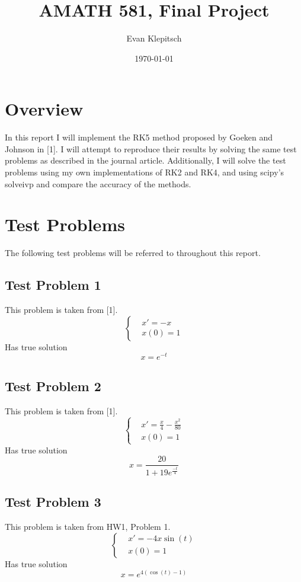 \documentclass{article}
\title{AMATH 581, Final Project}
\author{Evan Klepitsch}
\date{\today}
\begin{document}
\maketitle
\section{Overview}
In this report I will implement the RK5 method proposed by Goeken and Johnson in [1]. I will attempt to reproduce their results by solving the same test problems as described in the journal article.  Additionally, I will solve the test problems using my own implementations of RK2 and RK4, and using scipy's solve\textunderscore ivp and compare the accuracy of the methods.

\section{Test Problems}
The following test problems will be referred to throughout this report.
\subsection{Test Problem 1}
This problem is taken from [1].
\begin{equation} \label{eq:test_problem_1}
\left\{
\begin {aligned}
& x' = -x \\
& x(0) = 1
\end{aligned}
\right.
\end{equation}
Has true solution
\begin{equation}
x = e^{-t}
\end{equation}
\subsection{Test Problem 2}
This problem is taken from [1].
\begin{equation} \label{eq:test_problem_2}
\left\{
\begin {aligned}
& x' = \frac{x}{4} - \frac{x^2}{80} \\
& x(0) = 1
\end{aligned}
\right.
\end{equation}
Has true solution
\begin{equation}
x = \frac{20}{1 + 19e^{\frac{-t}{4}}}
\end{equation}
\subsection{Test Problem 3}
This problem is taken from HW1, Problem 1.
\begin{equation} \label{eq:test_problem_3}
\left\{
\begin {aligned}
& x' = -4x\sin(t) \\
& x(0) = 1
\end{aligned}
\right.
\end{equation}
Has true solution
\begin{equation}
x = e^{4(\cos(t) - 1)}
\end{equation}
\end{document}
